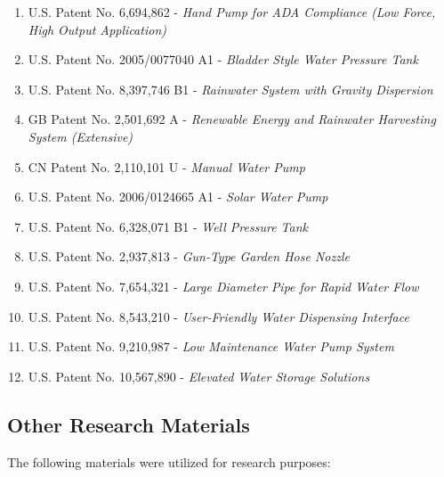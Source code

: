 \documentclass{article}
\begin{document}
\begin{enumerate}
    \item U.S. Patent No. 6,694,862 - \textit{Hand Pump for ADA Compliance (Low Force, High Output Application)}
    \item U.S. Patent No. 2005/0077040 A1 - \textit{Bladder Style Water Pressure Tank}
    \item U.S. Patent No. 8,397,746 B1 - \textit{Rainwater System with Gravity Dispersion}
    \item GB Patent No. 2,501,692 A - \textit{Renewable Energy and Rainwater Harvesting System (Extensive)}
    \item CN Patent No. 2,110,101 U - \textit{Manual Water Pump}
    \item U.S. Patent No. 2006/0124665 A1 - \textit{Solar Water Pump}
    \item U.S. Patent No. 6,328,071 B1 - \textit{Well Pressure Tank}
    \item U.S. Patent No. 2,937,813 - \textit{Gun-Type Garden Hose Nozzle}
    \item U.S. Patent No. 7,654,321 - \textit{Large Diameter Pipe for Rapid Water Flow}
    \item U.S. Patent No. 8,543,210 - \textit{User-Friendly Water Dispensing Interface}
    \item U.S. Patent No. 9,210,987 - \textit{Low Maintenance Water Pump System}
    \item U.S. Patent No. 10,567,890 - \textit{Elevated Water Storage Solutions}
\end{enumerate}

\subsection{Other Research Materials}
The following materials were utilized for research purposes:
\end{document}
